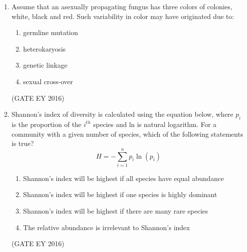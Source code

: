 \documentclass[journal]{IEEEtran}
\begin{document}
\begin{enumerate}
 


\item Assume that an asexually propagating fungus has three colors of colonies, white, black and red. Such variability in color may have originated due to:
\begin{multicols}{2}
\begin{enumerate}
    \item germline mutation
    \item heterokaryosis
    \item genetic linkage
    \item sexual cross-over
\end{enumerate}
\end{multicols}
\hfill{(GATE EY 2016)}

\item Shannon's index of diversity is calculated using the equation below, where $p_i$ is the proportion of the $i^{th}$ species and ln is natural logarithm. For a community with a given number of species, which of the following statements is true?
$$ H = -\sum_{i=1}^{n} p_i \ln(p_i) $$
\begin{enumerate}
    \item Shannon's index will be highest if all species have equal abundance
    \item Shannon's index will be highest if one species is highly dominant
    \item Shannon's index will be highest if there are many rare species
    \item The relative abundance is irrelevant to Shannon's index
\end{enumerate}
\hfill{(GATE EY 2016)}


\end{enumerate}
\end{document}
